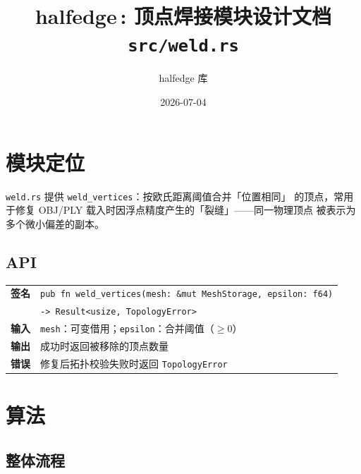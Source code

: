 \documentclass[11pt,a4paper]{article}
\title{\textbf{halfedge\,: 顶点焊接模块设计文档} \\ \large \texttt{src/weld.rs}}
\author{halfedge 库}
\date{2026-07-04}
\begin{document}
\maketitle
\tableofcontents

\section{模块定位}

\texttt{weld.rs} 提供 \texttt{weld\_vertices}：按欧氏距离阈值合并「位置相同」
的顶点，常用于修复 OBJ/PLY 载入时因浮点精度产生的「裂缝」——同一物理顶点
被表示为多个微小偏差的副本。

\subsection{API}

\begin{center}
\renewcommand{\arraystretch}{1.18}
\begin{tabular}{@{}ll@{}}
  \toprule
  \textbf{签名} & \texttt{pub fn weld\_vertices(mesh: \&mut MeshStorage, epsilon: f64)} \\
                & \hspace*{4em}\texttt{-> Result<usize, TopologyError>} \\
  \midrule
  \textbf{输入} & \texttt{mesh}：可变借用；\texttt{epsilon}：合并阈值（$\ge 0$） \\
  \textbf{输出} & 成功时返回被移除的顶点数量 \\
  \textbf{错误} & 修复后拓扑校验失败时返回 \texttt{TopologyError} \\
  \bottomrule
\end{tabular}
\end{center}

\section{算法}

\subsection{整体流程}
\end{document}
